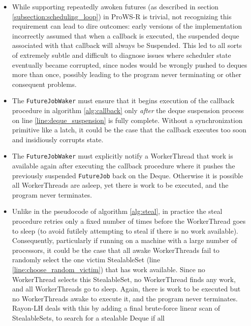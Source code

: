 \documentclass[bsc,frontabs,singlespacing,parskip,deptreport,normalheadings]{infthesis}
\begin{document}
\begin{itemize}
    \item While supporting repeatedly awoken futures (as described in section
        \ref{subsection:scheduling_loop}) in ProWS-R is trivial, not recognizing
        this requirement can lead to dire outcomes: early versions of the
        implementation incorrectly assumed that when a callback is executed, the
        suspended deque associated with that callback will always be Suspended.
        This led to all sorts of extremely subtle and difficult to diagnose
        issues where scheduler state eventually became corrupted, since nodes
        would be wrongly pushed to deques more than once, possibly leading to
        the program never terminating or other consequent problems.
    \item The \texttt{FutureJobWaker} must ensure that it begins execution of
        the callback procedure in algorithm \ref{alg:callback} only
        \textit{after} the deque suspension process on line
        \ref{line:deque_suspension} is fully complete. Without a synchronization
        primitive like a latch, it could be the case that the callback executes
        too soon and insidiously corrupts state.
    \item The \texttt{FutureJobWaker} must explicitly notify a WorkerThread that
        work is available again after executing the callback procedure where it
        pushes the previously suspended \texttt{FutureJob} back on the Deque.
        Otherwise it is possible all WorkerThreads are asleep, yet there is work
        to be executed, and the program never terminates.
    \item Unlike in the pseudocode of algorithm \ref{alg:steal}, in practice the
        steal procedure retries only a fixed number of times before the
        WorkerThread goes to sleep (to avoid futilely attempting to steal if
        there is no work available). Consequently, particularly if running on a
        machine with a large number of processors, it could be the case that all
        awake WorkerThreads fail to randomly select the one victim StealableSet
        (line \ref{line:choose_random_victim}) that has work available. Since no
        WorkerThread selects this StealableSet, no WorkerThread finds any work,
        and all WorkerThreads go to sleep. Again, there is work to be executed
        but no WorkerThreads awake to execute it, and the program never
        terminates. Rayon-LH deals with this by adding a final brute-force
        linear scan of StealableSets, to search for a stealable Deque if all

\end{itemize}
\end{document}
